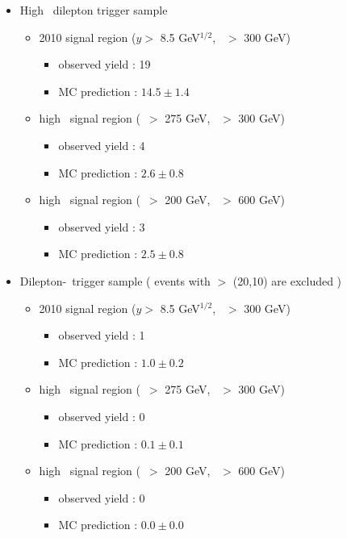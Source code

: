 \begin{itemize}
\item High \pt\ dilepton trigger sample
\begin{itemize}
\item 2010 signal region ($y >$ 8.5 GeV$^{1/2}$, \Ht\ $>$ 300 GeV)
   \begin{itemize} 
   \item observed yield : 19 
   \item MC prediction  : $14.5 \pm 1.4$
   \end{itemize}  
\item high \met\ signal region (\met\ $>$ 275 GeV, \Ht\ $>$ 300 GeV)
   \begin{itemize} 
   \item observed yield : 4 
   \item MC prediction  : $2.6 \pm 0.8$
   \end{itemize}  
\item high \Ht\ signal region (\met\ $>$ 200 GeV, \Ht\ $>$ 600 GeV)
   \begin{itemize} 
   \item observed yield : 3 
   \item MC prediction  : $2.5 \pm 0.8$
   \end{itemize}  
\end{itemize}

\item Dilepton-\Ht\ trigger sample ( events with \pt $>$ (20,10) are excluded )
\begin{itemize}
\item 2010 signal region ($y >$ 8.5 GeV$^{1/2}$, \Ht\ $>$ 300 GeV)
   \begin{itemize} 
   \item observed yield : 1 
   \item MC prediction  : $1.0 \pm 0.2$
   \end{itemize}  
\item high \met\ signal region (\met\ $>$ 275 GeV, \Ht\ $>$ 300 GeV)
   \begin{itemize} 
   \item observed yield : 0 
   \item MC prediction  : $0.1 \pm 0.1$
   \end{itemize}  
\item high \Ht\ signal region (\met\ $>$ 200 GeV, \Ht\ $>$ 600 GeV)
   \begin{itemize} 
   \item observed yield : 0 
   \item MC prediction  : $0.0 \pm 0.0$
   \end{itemize}  
\end{itemize}
\end{itemize}

